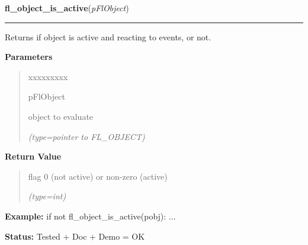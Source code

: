 \hspace{.8\funcindent}\begin{boxedminipage}{\funcwidth}

    \raggedright \textbf{fl\_object\_is\_active}(\textit{pFlObject})

    \vspace{-1.5ex}

    \rule{\textwidth}{0.5\fboxrule}
\setlength{\parskip}{2ex}
    Returns if object is active and reacting to events, or not.

\setlength{\parskip}{1ex}
      \textbf{Parameters}
      \vspace{-1ex}

      \begin{quote}
        \begin{Ventry}{xxxxxxxxx}

          \item[pFlObject]

          object to evaluate

            {\it (type=pointer to FL\_OBJECT)}

        \end{Ventry}

      \end{quote}

      \textbf{Return Value}
    \vspace{-1ex}

      \begin{quote}
      flag 0 (not active) or non-zero (active)

      {\it (type=int)}

      \end{quote}

\textbf{Example:} if not fl\_object\_is\_active(pobj): ...



\textbf{Status:} Tested + Doc + Demo = OK



    \end{boxedminipage}

    \label{xformslib:flbasic:fl_enumerate_fonts}

    \vspace{0.5ex}

